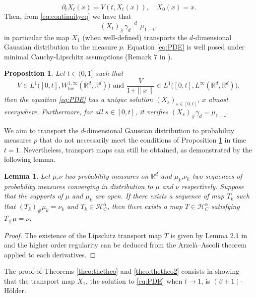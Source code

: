 \documentclass{article}
\newtheorem{proposition}{Proposition}
\newtheorem{lemma}{Lemma}
\begin{document}
\begin{equation}\label{eq:PDE}
\partial_t X_t(x) =V(t,X_t(x)), \quad X_0(x)=x.
\end{equation}
Then, from \eqref{eq:continuityeq}  we have that $$(X_{t})_{\#}\gamma_d\overset{d}{=}\mu_{1-t},$$
in particular the map $X_1$ (when well-defined) transports the $d$-dimensional Gaussian distribution to the measure $p$.
Equation \eqref{eq:PDE} is well posed under minimal Cauchy-Lipschitz assumptions (Remark 7 in \cite{Ambrosio_Crippa_2014}).
\begin{proposition}\label{prop:condiwelldifned}
    Let $t\in (0,1]$ such that 
$$V\in L^1\Big([0,t],W^{1,\infty}_{loc}(\mathbb{R}^d,\mathbb{R}^d)\Big)\text{ and } \frac{V}{1+\|x\|}\in L^1\Big([0,t],L^{\infty}(\mathbb{R}^d,\mathbb{R}^d)\Big),$$
    then the equation \eqref{eq:PDE} has a unique solution $(X_s)_{s\in [0,t]}$, $x$ almost everywhere. Furthermore, for all $s\in [0,t]$, it verifies $(X_{s})_{\# }\gamma_d=\mu_{1-s}$.
\end{proposition}
We aim to transport the $d$-dimensional Gaussian distribution to probability measures $p$ that do not necessarily meet the conditions of Proposition \ref{prop:condiwelldifned} in time $t=1$. Nevertheless, transport maps can still be obtained, as demonstrated by the following lemma.

\begin{lemma}\label{lemma:convergenceofmap}
    Let $\mu$,$\nu$ two probability measures on $\mathbb{R}^d$ and $\mu_k$,$\nu_k$ two sequences of probability measures converging in distribution to $\mu$ and $\nu$ respectively. Suppose that the supports of $\mu$ and $\mu_k$  are open.  If there exists a sequence of map $T_k$ such that $(T_k)_{\# }\mu_k=\nu_k$ and $T_k\in \mathcal{H}^\alpha_C$, then there exists a map $T\in \mathcal{H}^\alpha_C$ satisfying $T_{\#} \mu=\nu$. 
\end{lemma}

\begin{proof}
 The existence of the Lipschitz transport map $T$ is given by Lemma 2.1  in  \cite{neeman2022lipschitz} and the higher order regularity can be deduced from the Arzelà–Ascoli theorem applied to each derivatives. 
\end{proof}








The proof of Theorems \ref{theo:thetheo} and \ref{theo:thetheo2} consists in showing that the transport map $X_1$, the solution to \eqref{eq:PDE} when $t\rightarrow 1$, is $(\beta+1)$-Hölder.
\end{document}
